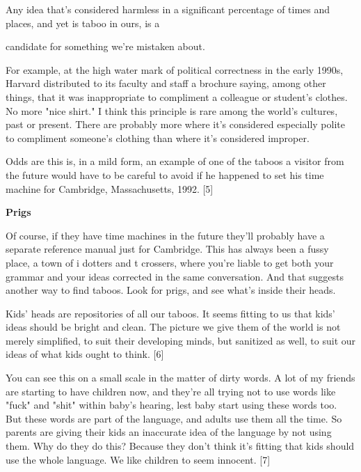                   Any idea that's considered harmless in a significant
                  percentage of times and places, and yet is taboo in ours, is a
                  
                  candidate for something we're mistaken about.

For
                  example, at the high water mark of political correctness in
                  the early 1990s, Harvard distributed to its faculty and staff
                  a brochure saying, among other things, that it was
                  inappropriate to compliment a colleague or student's clothes.
                  No more "nice shirt." I think this principle is rare among the
                  world's cultures, past or present. There are probably more
                  where it's considered especially polite to compliment
                  someone's clothing than where it's considered improper.
                  
                  Odds are this is, in a mild form, an example of one of the
                  taboos a visitor from the future would have to be careful to
                  avoid if he happened to set his time machine for Cambridge,
                  Massachusetts, 1992. [5]

\textbf{Prigs}

Of
                  course, if they have time machines in the future they'll
                  probably have a separate reference manual just for Cambridge.
                  This has always been a fussy place, a town of i dotters and t
                  crossers, where you're liable to get both your grammar and
                  your ideas corrected in the same conversation. And that
                  suggests another way to find taboos. Look for prigs, and see
                  what's inside their heads.

Kids' heads are
                  repositories of all our taboos. It seems fitting to us that
                  kids' ideas should be bright and clean. The picture we give
                  them of the world is not merely simplified, to suit their
                  developing minds, but sanitized as well, to suit our ideas of
                  what kids ought to think. [6]

You can see this on a
                  small scale in the matter of dirty words. A lot of my friends
                  are starting to have children now, and they're all trying not
                  to use words like "fuck" and "shit" within baby's hearing,
                  lest baby start using these words too. But these words are
                  part of the language, and adults use them all the time. So
                  parents are giving their kids an inaccurate idea of the
                  language by not using them. Why do they do this? Because they
                  don't think it's fitting that kids should use the whole
                  language. We like children to seem innocent. [7]

